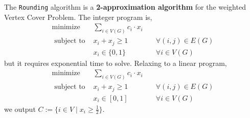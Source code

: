 \begin{thm}
	The \texttt{Rounding} algorithm is a \textbf{2-approximation algorithm} for the weighted Vertex Cover Problem. The integer program is,
	\[
	\begin{array}{lll}
		\operatorname{minimize} & \sum_{i \in V(G)} c_i \cdot x_i & \\
		\text{ subject to } & x_i + x_j \geq 1 & \quad \forall (i, j) \in E(G) \\
		& x_i \in\{0,1\} & \quad \forall i \in V(G)
	\end{array}
	\]
	\noindent but it requires exponential time to solve. Relaxing to a linear program,
	\[
	\begin{array}{lll}
		\operatorname{minimize} & \sum_{i \in V(G)} c_i \cdot x_i & \\
		\text{ subject to } & x_i + x_j \geq 1 & \quad \forall (i, j) \in E(G) \\
		& x_i \in [0,1] & \quad \forall i \in V(G)
	\end{array}
	\]
	\noindent we output $C := \{i \in V \mid x_i \geq \frac{1}{2}\}$.
\end{thm}


